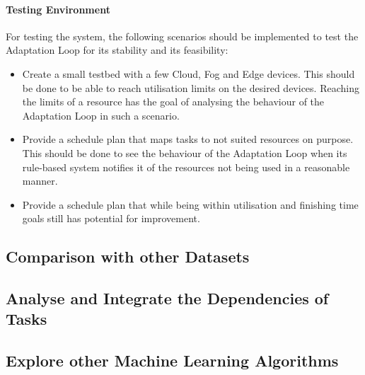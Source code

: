             \paragraph{Testing Environment}
            For testing the system, the following scenarios should be implemented to test the Adaptation Loop for its stability and its feasibility:
            \begin{itemize}
                \item Create a small testbed with a few Cloud, Fog and Edge devices. This should be done to be able to reach utilisation limits on the desired devices. Reaching the limits of a resource has the goal of analysing the behaviour of the Adaptation Loop in such a scenario.
                \item Provide a schedule plan that maps tasks to not suited resources on purpose. This should be done to see the behaviour of the Adaptation Loop when its rule-based system notifies it of the resources not being used in a reasonable manner.
                \item Provide a schedule plan that while being within utilisation and finishing time goals still has potential for improvement.
            \end{itemize}

        \subsection{Comparison with other Datasets}
        \label{sec:comparison-with-other-datasets-future-work}


        \subsection{Analyse and Integrate the Dependencies of Tasks}
        \label{sec:analyse-and-integrate-the-dependencies-of-tasks-future-work}


        \subsection{Explore other Machine Learning Algorithms}
        \label{sec:explore-other-machine-learning-algorithms-future-work}

